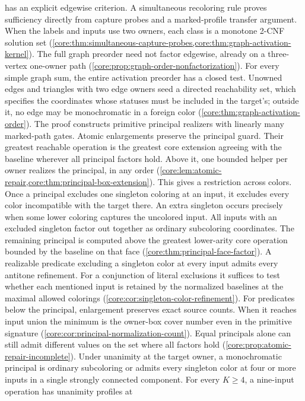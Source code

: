 has an explicit edgewise criterion. A simultaneous recoloring rule
proves sufficiency directly from capture probes and a marked-profile
transfer argument. When the labels and inputs use two owners, each
class is a monotone 2-CNF solution set
(\cref{core:thm:simultaneous-capture-probes,core:thm:graph-activation-kernel}).
The full graph preorder need not factor edgewise, already on a
three-vertex one-owner path (\cref{core:prop:graph-order-nonfactorization}).
For every simple graph sum, the entire activation preorder has a
closed test. Unowned edges and triangles with two edge owners seed
a directed reachability set, which
specifies the coordinates whose statuses must be included in the
target's; outside it, no edge may be monochromatic in a foreign color
(\cref{core:thm:graph-activation-order}). The proof constructs
primitive principal realizers with linearly many marked-path gates.
Atomic enlargements preserve the principal guard. Their greatest
reachable operation is the greatest core extension agreeing with the
baseline wherever all principal factors hold. Above it, one bounded
helper per owner realizes the principal, in any order
(\cref{core:lem:atomic-repair,core:thm:principal-box-extension}).
This gives a restriction across colors. Once a principal excludes one
singleton coloring at an input, it excludes every color incompatible
with the target there. An extra singleton occurs precisely when some
lower coloring captures the uncolored input. All inputs with an
excluded singleton factor out together as ordinary subcoloring
coordinates. The remaining principal is computed above the greatest
lower-arity core operation bounded by the baseline on that face
(\cref{core:thm:principal-face-factor}). A realizable predicate excluding a singleton
color at every input admits every antitone refinement. For a conjunction
of literal exclusions it suffices to test whether each mentioned input
is retained by the normalized baselines at the maximal allowed colorings
(\cref{core:cor:singleton-color-refinement}). For predicates below
the principal, enlargement preserves exact source counts. When it
reaches input union the minimum is the owner-box cover number even in
the primitive signature (\cref{core:cor:principal-normalization-count}).
Equal principals alone
can still admit different values on the set where all factors hold
(\cref{core:prop:atomic-repair-incomplete}).
Under unanimity at the target owner, a monochromatic principal is
ordinary subcoloring or admits every singleton color at four or more
inputs in a single strongly connected component.
For every $K\geq4$, a nine-input operation has unanimity profiles at
